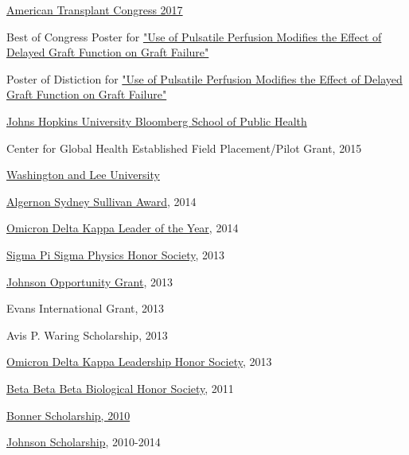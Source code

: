 \documentclass[10pt]{article}
\newcommand{\halfblankline}{\quad\vspace{-0.5\baselineskip}\pagebreak[3]}
\begin{document}
\halfblankline

\href{http://atcmeeting.org/}{American Transplant Congress 2017}
\begin{innerlist}
\item Best of Congress Poster for
  \href{http://atcmeetingabstracts.com/abstract/use-of-pulsatile-perfusion-modifies-the-effect-of-delayed-graft-function-on-graft-failure/}
  {"Use of Pulsatile Perfusion Modifies the Effect of Delayed Graft Function on Graft Failure"}
\item Poster of Distiction for
  \href{http://atcmeetingabstracts.com/abstract/use-of-pulsatile-perfusion-modifies-the-effect-of-delayed-graft-function-on-graft-failure/}
  {"Use of Pulsatile Perfusion Modifies the Effect of Delayed Graft Function on Graft Failure"}
\end{innerlist}

\halfblankline

\href{http://www.jhsph.edu/}{Johns Hopkins University Bloomberg School of Public Health}
\begin{innerlist}
\item Center for Global Health Established Field Placement/Pilot Grant, 2015

\halfblankline

\end{innerlist}

\href{https://www.wlu.edu/}{Washington and Lee University}
\begin{innerlist}
\item \href{https://www.wlu.edu/university-registrar/policies-and-procedures/university-honors-board/sullivan-award}{Algernon Sydney Sullivan Award}, 2014
\item \href{http://odk.org/circle/wlu/}{Omicron Delta Kappa Leader of the Year}, 2014
\item \href{https://www.wlu.edu/physics-and-engineering-department/opportunities-for-students/physics-honor-society}{Sigma Pi Sigma Physics Honor Society}, 2013
\item \href{https://www.wlu.edu/johnson-program/johnson-opportunity-grants/past-recipients/2013-johnson-opportunity-grant-winners/alvin-thomas-14}{Johnson Opportunity Grant}, 2013
\item Evans International Grant, 2013
\item Avis P. Waring Scholarship, 2013
\item \href{https://www.wlu.edu/university-registrar/policies-and-procedures/university-honors-board/omicron-delta-kappa}{Omicron Delta Kappa Leadership Honor Society}, 2013
\item \href{http://www2.wlu.edu/x36446.xml}{Beta Beta Beta Biological Honor Society}, 2011
\item \href{https://www.wlu.edu/shepherd-program/community-based-learning-opportunities/bonner-program}{Bonner Scholarship, 2010}
\item \href{https://www.wlu.edu/johnson-program/the-johnson-scholarship}{Johnson Scholarship}, 2010-2014

\end{innerlist}
\end{document}
